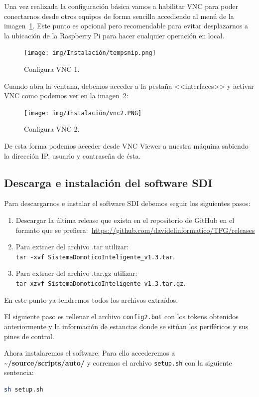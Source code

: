 Una vez realizada la configuración básica vamos a habilitar VNC para poder conectarnos desde otros equipos de forma sencilla accediendo al menú de la imagen~\ref{VNC1}. Este punto es opcional pero recomendable para evitar desplazarnos a la ubicación de la Raspberry Pi para hacer cualquier operación en local.

\begin{figure}[h]
\centering
\texttt{[image: img/Instalación/tempsnip.png]}
\caption{Configura VNC 1.}\label{VNC1}
\end{figure}

Cuando abra la ventana, debemos acceder a la pestaña <<interfaces>> y activar VNC como podemos ver en la imagen~\ref{VNC2}:

\begin{figure}[h]
\centering
\texttt{[image: img/Instalación/vnc2.PNG]}
\caption{Configura VNC 2.}\label{VNC2}
\end{figure}

De esta forma podemos acceder desde VNC Viewer a nuestra máquina sabiendo la dirección IP, usuario y contraseña de ésta.

\subsection{Descarga e instalación del software SDI}
Para descargarnos e instalar el software SDI debemos seguir los siguientes pasos:

\begin{enumerate}
    \item Descargar la última release que exista en el repositorio de GitHub en el formato que se prefiera:~\url{https://github.com/davidelinformatico/TFG/releases}
    \item Para extraer del archivo .tar utilizar:~\\ \texttt{tar -xvf SistemaDomoticoInteligente\_v1.3.tar}.
    \item Para extraer del archivo .tar.gz utilizar:~\\ \texttt{tar xzvf SistemaDomoticoInteligente\_v1.3.tar.gz}.
\end{enumerate}
En este punto ya tendremos todos los archivos extraídos.

El siguiente paso es rellenar el archivo \texttt{config2.bot} con los tokens obtenidos anteriormente y la información de estancias donde se sitúan los periféricos y sus pines de control.

Ahora instalaremos el software. Para ello accederemos a \textbf{\textasciitilde/source/scripts/auto/} y corremos el archivo \texttt{setup.sh} con la siguiente sentencia:
\begin{lstlisting}[language=sh,firstnumber=0]
sh setup.sh
\end{lstlisting}

